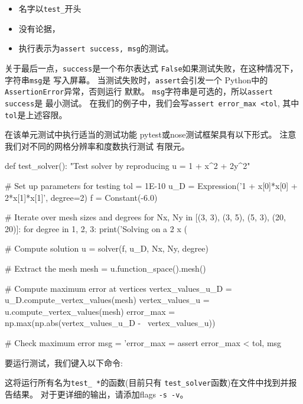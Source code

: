 \begin{itemize}
 \item 名字以\verb!test_!开头

 \item 没有论据，

 \item 执行表示为\texttt{assert success, msg}的测试。
\end{itemize}

\noindent
关于最后一点，\texttt{success}是一个布尔表达式
\texttt{False}如果测试失败，在这种情况下，字符串\texttt{msg}是
写入屏幕。 当测试失败时，\texttt{assert}会引发一个
Python中的\texttt{AssertionError}异常，否则运行
默默。 \texttt{msg}字符串是可选的，所以\texttt{assert success}是
最小测试。 在我们的例子中，我们会写\verb!assert error_max <tol!,
其中\texttt{tol}是上述容限。

在该单元测试中执行适当的测试功能
pytest或nose测试框架具有以下形式。 注意
我们对不同的网格分辨率和度数执行测试
有限元。

\begin{python}
def test_solver():
    "Test solver by reproducing u = 1 + x^2 + 2y^2"

    # Set up parameters for testing
    tol = 1E-10
    u_D = Expression('1 + x[0]*x[0] + 2*x[1]*x[1]', degree=2)
    f = Constant(-6.0)

    # Iterate over mesh sizes and degrees
    for Nx, Ny in [(3, 3), (3, 5), (5, 3), (20, 20)]:
        for degree in 1, 2, 3:
            print('Solving on a 2 x (%

            # Compute solution
            u = solver(f, u_D, Nx, Ny, degree)

            # Extract the mesh
            mesh = u.function_space().mesh()

            # Compute maximum error at vertices
            vertex_values_u_D = u_D.compute_vertex_values(mesh)
            vertex_values_u  = u.compute_vertex_values(mesh)
            error_max = np.max(np.abs(vertex_values_u_D - \
                                      vertex_values_u))

            # Check maximum error
            msg = 'error_max = %
            assert error_max < tol, msg
\end{python}

要运行测试，我们键入以下命令:

这将运行所有名为\verb!test_ *!的函数(目前只有
\verb!test_solver!函数)在文件中找到并报告结果。
对于更详细的输出，请添加flags \texttt{-s -v}。

